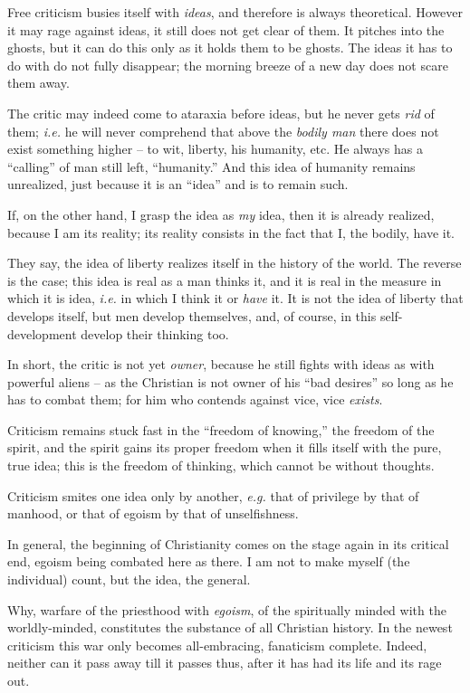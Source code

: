 \documentclass[12pt,a4paper]{book}
\begin{document}
Free criticism busies itself with \textit{ideas}, and therefore is always 
theoretical. However it may rage against ideas, it still does not get clear of 
them. It pitches into the ghosts, but it can do this only as it holds them to 
be ghosts. The ideas it has to do with do not fully disappear; the morning 
breeze of a new day does not scare them away.

The critic may indeed come to ataraxia before ideas, but he never gets 
\textit{rid} of them; \textit{i.e.} he will never comprehend that above the 
\textit{bodily man} there does not exist something higher -- to wit, liberty, 
his humanity, etc. He always has a ``calling'' of man still left, 
``humanity.'' And this idea of humanity remains unrealized, just because it 
is an ``idea'' and is to remain such.

If, on the other hand, I grasp the idea as \textit{my} idea, then it is 
already realized, because I am its reality; its reality consists in the fact 
that I, the bodily, have it.

They say, the idea of liberty realizes itself in the history of the world. The 
reverse is the case; this idea is real as a man thinks it, and it is real in 
the measure in which it is idea, \textit{i.e.} in which I think it or 
\textit{have} it. It is not the idea of liberty that develops itself, but men 
develop themselves, and, of course, in this self-development develop their 
thinking too.

In short, the critic is not yet \textit{owner}, because he still fights with 
ideas as with powerful aliens -- as the Christian is not owner of his ``bad 
desires'' so long as he has to combat them; for him who contends against 
vice, vice \textit{exists}.

Criticism remains stuck fast in the ``freedom of knowing,'' the freedom of 
the spirit, and the spirit gains its proper freedom when it fills itself with 
the pure, true idea; this is the freedom of thinking, which cannot be without 
thoughts.

Criticism smites one idea only by another, \textit{e.g.} that of privilege by 
that of manhood, or that of egoism by that of unselfishness.

In general, the beginning of Christianity comes on the stage again in its 
critical end, egoism being combated here as there. I am not to make myself 
(the individual) count, but the idea, the general.

Why, warfare of the priesthood with \textit{egoism}, of the spiritually minded 
with the worldly-minded, constitutes the substance of all Christian history. 
In the newest criticism this war only becomes all-embracing, fanaticism 
complete. Indeed, neither can it pass away till it passes thus, after it has 
had its life and its rage out.
\end{document}
